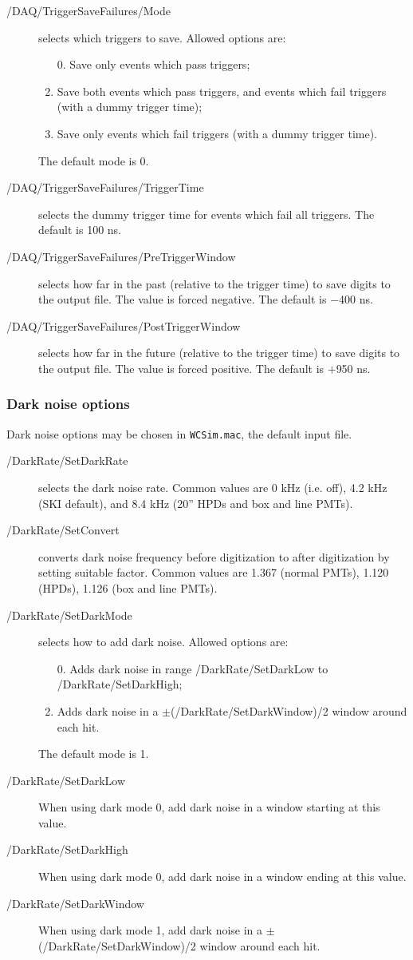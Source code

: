 \begin{description}
\item[/DAQ/TriggerSaveFailures/Mode] selects which triggers to save. Allowed options are:
  \begin{enumerate}
  \item [0.]\setcounter{enumi}{0} Save only events which pass triggers;
  \item Save both events which pass triggers, and events which fail triggers (with a dummy trigger time);
  \item Save only events which fail triggers (with a dummy trigger time).
  \end{enumerate}
The default mode is 0.
\item[/DAQ/TriggerSaveFailures/TriggerTime] selects the dummy trigger time for events which fail all triggers. The default is 100 ns.
\item[/DAQ/TriggerSaveFailures/PreTriggerWindow] selects how far in the past (relative to the trigger time) to save digits to the output file. The value is forced negative. The default is $-$400 ns. 
\item[/DAQ/TriggerSaveFailures/PostTriggerWindow] selects how far in the future (relative to the trigger time) to save digits to the output file. The value is forced positive. The default is $+$950 ns. 
\end{description}

\subsubsection{Dark noise options}
Dark noise options may be chosen in \texttt{WCSim.mac}, the default input file.
\begin{description}
\item[/DarkRate/SetDarkRate] selects the dark noise rate. Common values are 0 kHz (i.e. off), 4.2 kHz (SKI default), and 8.4 kHz (20'' HPDs and box and line PMTs).
\item[/DarkRate/SetConvert] converts dark noise frequency before digitization to after digitization by setting suitable factor. Common values are 1.367 (normal PMTs), 1.120 (HPDs), 1.126 (box and line PMTs).
\item[/DarkRate/SetDarkMode] selects how to add dark noise. Allowed options are:
  \begin{enumerate}
  \item [0.]\setcounter{enumi}{0} Adds dark noise in range /DarkRate/SetDarkLow to /DarkRate/SetDarkHigh;
  \item Adds dark noise in a $\pm$(/DarkRate/SetDarkWindow)/2 window around each hit.
  \end{enumerate}
The default mode is 1.
\item[/DarkRate/SetDarkLow] When using dark mode 0, add dark noise in a window starting at this value.
\item[/DarkRate/SetDarkHigh] When using dark mode 0, add dark noise in a window ending at this value.
\item[/DarkRate/SetDarkWindow] When using dark mode 1, add dark noise in a $\pm$(/DarkRate/SetDarkWindow)/2 window around each hit.
\end{description}

